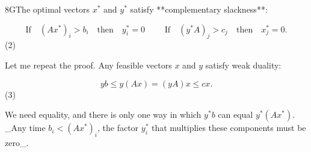 8GThe optimal vectors \(x^{*}\) and \(y^{*}\) satisfy **complementary slackness**:

\[\text{If}\quad(Ax^{*})_{i}>b_{i}\quad\text{then}\quad y_{i}^{*}=0\qquad\text{ If}\quad(y^{*}A)_{j}>c_{j}\quad\text{then}\quad x_{j}^{*}=0.\] (2)

Let me repeat the proof. Any feasible vectors \(x\) and \(y\) satisfy weak duality:

\[yb\leq y(Ax)=(yA)x\leq cx.\] (3)

We need equality, and there is only one way in which \(y^{*}b\) can equal \(y^{*}(Ax^{*})\). _Any time \(b_{i}<(Ax^{*})_{i}\), the factor \(y_{i}^{*}\) that multiplies these components must be zero_.

 
